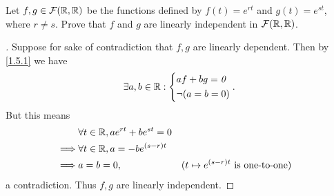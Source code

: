 \begin{ex}\label{ex:1.5.20}
	Let \(f, g \in \mathcal{F}(\mathbb{R}, \mathbb{R})\) be the functions defined by \(f(t) = e^{rt}\) and \(g(t) = e^{st}\), where \(r \neq s\).
	Prove that \(f\) and \(g\) are linearly independent in \(\mathcal{F}(\mathbb{R}, \mathbb{R})\).
\end{ex}

\begin{proof}[]
	Suppose for sake of contradiction that \(f, g\) are linearly dependent.
	Then by \cref{1.5.1} we have
	\[
		\exists a, b \in \mathbb{R} : \begin{dcases}
			af + bg = \mathit{0} \\
			\lnot (a = b = 0)
		\end{dcases}.
	\]
	But this means
	\begin{align*}
		         & \forall t \in \mathbb{R}, ae^{rt} + be^{st} = 0                                                         \\
		\implies & \forall t \in \mathbb{R}, a = -b e^{(s - r) t}                                                          \\
		\implies & a = b = 0,                              &  & \text{(\(t \mapsto e^{(s - r) t}\) is one-to-one)}
	\end{align*}
	a contradiction.
	Thus \(f, g\) are linearly independent.
\end{proof}
